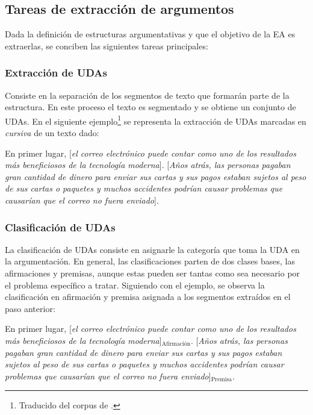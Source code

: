 \subsection{Tareas de extracción de argumentos}

Dada la definición de estructuras argumentativas y que el objetivo de la EA es extraerlas,
se conciben las siguientes tareas principales:

\subsubsection{Extracción de UDAs}

Consiste en la separación de los segmentos de texto que formarán parte de la estructura.
En este proceso el texto es segmentado y se obtiene un conjunto de UDAs. En el siguiente 
ejemplo\footnote{Traducido del corpus de 
\textcite{stab2017parsing}
.} se representa 
la extracción de UDAs marcadas en \emph{cursiva} de un texto dado:

\begin{adjustwidth}{25pt}{25pt}
    En primer lugar, [\emph{el correo electrónico puede contar como uno de los resultados
    más beneficiosos de la tecnología moderna}]. [\emph{Años atrás, las personas pagaban gran cantidad de dinero para 
    enviar sus cartas y sus pagos estaban sujetos al peso de sus cartas o paquetes y muchos accidentes podrían 
    causar problemas que causarían que el correo no fuera enviado}].
\end{adjustwidth}

\subsubsection{Clasificación de UDAs}

La clasificación de UDAs consiste en asignarle la categoría que toma la UDA en la argumentación. En general, 
las clasificaciones parten de dos clases bases, las afirmaciones y premisas, aunque estas pueden ser tantas
como sea necesario por el problema específico a tratar. Siguiendo con el ejemplo, se observa la clasificación
en afirmación y premisa asignada a los segmentos extraídos en el paso anterior:

\begin{adjustwidth}{25pt}{25pt}
    En primer lugar, [\emph{el correo electrónico puede contar como uno de los resultados
    más beneficiosos de la tecnología moderna}]$_{\mathrm{Afirmación}}$. [\emph{Años atrás, las personas pagaban gran cantidad de dinero para 
    enviar sus cartas y sus pagos estaban sujetos al peso de sus cartas o paquetes y muchos accidentes podrían 
    causar problemas que causarían que el correo no fuera enviado}]$_{\mathrm{Premisa}}$.
\end{adjustwidth}

